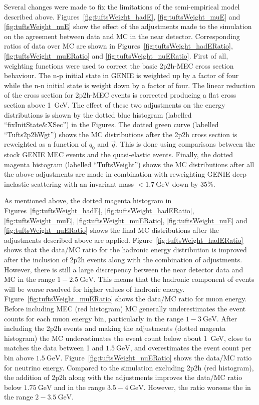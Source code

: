 Several changes were made to fix the limitations of the semi-empirical
model described above.
Figures~\ref{fig:tuftsWeight_hadE}, \ref{fig:tuftsWeight_muE} and
\ref{fig:tuftsWeight_nuE} show the effect of the adjustments made to
the simulation on the agreement between data and MC in the near
detector. Corresponding ratios of data over MC are shown in
Figures~\ref{fig:tuftsWeight_hadERatio}, \ref{fig:tuftsWeight_muERatio} and
\ref{fig:tuftsWeight_nuERatio}.  
First of all, weighting functions were used to correct the basic
2p2h-MEC cross section behaviour.  
The n-p initial state in GENIE is weighted up by a factor of four
while the n-n initial state is weight down by a factor of four.
The linear reduction of the cross section for 2p2h-MEC events is
corrected producing a flat cross section above 1~GeV. The effect of
these two adjustments on the energy distributions is shown by the
dotted blue histogram (labelled ``fixInitState\&XSec'') in the Figures.
The dotted green curve (labelled ``Tufts2p2hWgt'') shows the MC
distributions after the 2p2h cross section is reweighted as a function
of $q_0$ and $\vec{q}$. 
This is done using comparisons between the stock GENIE MEC events and
the quasi-elastic events.
Finally, the dotted magenta histogram (labelled ``TuftsWeight'') shows
the MC distributions after all the above adjustments are made in
combination with reweighting GENIE deep inelastic scattering with an
invariant mass $< 1.7~\text{GeV}$ down by 35\%.~\cite{tuftsWeightNote}

As mentioned above, the dotted magenta histogram in
Figures~\ref{fig:tuftsWeight_hadE}, \ref{fig:tuftsWeight_hadERatio},
\ref{fig:tuftsWeight_muE}, \ref{fig:tuftsWeight_muERatio},
\ref{fig:tuftsWeight_nuE} and \ref{fig:tuftsWeight_nuERatio} shows the
final MC distributions after the adjustments described above are
applied. 
Figure~\ref{fig:tuftsWeight_hadERatio} shows that the data/MC
ratio for the hadronic energy distribution is improved after the
inclusion of 2p2h events along with the combination of
adjustments. However, there is still a large discrepency between the
near detector data and MC in the range $1 - 2.5~\text{GeV}$. This
means that the hadronic component of events will be worse resolved for
higher values of hadronic energy. 
Figure~\ref{fig:tuftsWeight_muERatio} shows the data/MC ratio for muon
energy. Before including MEC (red histogram) MC generally
underestimates the event counts for each muon energy bin, particularly
in the range $1-3~\text{GeV}$. After including the 2p2h events and
making the adjustments (dotted magenta histogram) the MC
underestimates the event count below about 1~GeV, close to matches the
data between 1 and $1.5~\text{GeV}$, and overestimates the event count
per bin above $1.5~\text{GeV}$.
Figure~\ref{fig:tuftsWeight_nuERatio} shows the data/MC ratio for
neutrino energy. Compared to the simulation excluding 2p2h (red
histogram), the addition of 2p2h along with the adjustments 
improves the data/MC ratio below $1.75~\text{GeV}$ and in the range
$3.5 - 4~\text{GeV}$. However, the ratio worsens the in the range
$2 - 3.5~\text{GeV}$.


